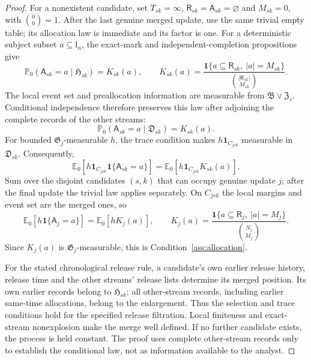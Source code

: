 \documentclass[12pt]{article}
\theoremstyle{definition}
\theoremstyle{remark}
\begin{document}
\begin{proof}
For a nonexistent candidate, set $T_{sk}=\infty$, $\mathsf R_{sk}=\mathsf A_{sk}=\varnothing$ and $M_{sk}=0$, with $\binom00=1$. After the last genuine merged update, use the same trivial empty table; its allocation law is immediate and its factor is one. For a deterministic subject subset $a\subseteq\mathsf I_n$, the exact-mark and independent-completion propositions give
\[
 \mathbb P_0(\mathsf A_{sk}=a\mid\mathfrak H_{sk})
 =K_{sk}(a),\qquad
 K_{sk}(a)=
 \frac{\mathbf1\{a\subseteq\mathsf R_{sk},\ |a|=M_{sk}\}}
      {\binom{|\mathsf R_{sk}|}{M_{sk}}}.
\]
The local event set and preallocation information are measurable from $\mathfrak B\vee\mathfrak Z_s$. Conditional independence therefore preserves this law after adjoining the complete records of the other streams:
\[
 \mathbb P_0(\mathsf A_{sk}=a\mid\mathfrak D_{sk})=K_{sk}(a).
\]
For bounded $\mathfrak G_j$-measurable $h$, the trace condition makes $h\mathbf1_{C_{jsk}}$ measurable in $\mathfrak D_{sk}$. Consequently,
\[
 \mathbb E_0[h\mathbf1_{C_{jsk}}\mathbf1\{\mathsf A_{sk}=a\}]
 =\mathbb E_0[h\mathbf1_{C_{jsk}}K_{sk}(a)].
\]
Sum over the disjoint candidates $(s,k)$ that can occupy genuine update $j$; after the final update the trivial law applies separately. On $C_{jsk}$ the local margins and event set are the merged ones, so
\[
 \mathbb E_0[h\mathbf1\{\mathsf A_j=a\}]
 =\mathbb E_0[hK_j(a)],\qquad
 K_j(a)=\frac{\mathbf1\{a\subseteq\mathsf R_j,\ |a|=M_j\}}
                    {\binom{N_j}{M_j}}.
\]
Since $K_j(a)$ is $\mathfrak G_j$-measurable, this is Condition~\ref{ass:allocation}.

For the stated chronological release rule, a candidate's own earlier release history, release time and the other streams' release lists determine its merged position. Its own earlier records belong to $\mathfrak H_{sk}$; all other-stream records, including earlier same-time allocations, belong to the enlargement. Thus the selection and trace conditions hold for the specified release filtration. Local finiteness and exact-stream nonexplosion make the merge well defined. If no further candidate exists, the process is held constant. The proof uses complete other-stream records only to establish the conditional law, not as information available to the analyst.
\end{proof}
\end{document}

